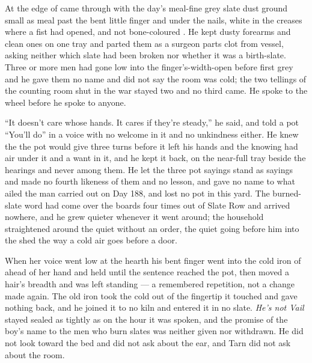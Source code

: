 At the edge of   came through with the day's meal-fine grey slate dust ground small as meal past the bent little finger and under the nails, white in the creases where a fist had opened, and not bone-coloured . He kept dusty forearms and clean ones on one tray and parted them as a surgeon parts clot from vessel, asking neither which slate had been broken nor whether it was a birth-slate. Three or more men had gone low into the finger's-width-open  before first grey and he gave them no name and did not say the room was cold; the two tellings of the counting room shut in the war stayed two and no third came. He spoke to the wheel before he spoke to anyone.

“It doesn't care whose hands. It cares if they're steady,” he said, and told a pot “You'll do” in a voice with no welcome in it and no unkindness either. He knew the  the pot would give three turns before it left his hands and the knowing had air under it and a want in it, and he kept it back, on the near-full tray beside the hearings and never among them. He let the three pot sayings stand as sayings and made no fourth likeness of them and no lesson, and gave no name to what ailed the man carried out on Day 188, and lost no pot in this yard. The burned-slate word had come over the boards four times out of Slate Row and arrived nowhere, and he grew quieter whenever it went around; the household straightened around the quiet without an order, the quiet going before him into the shed the way a cold air goes before a door.

When her voice went low at the hearth his bent finger went into the cold iron of  ahead of her hand and held until the sentence reached the pot, then moved a hair's breadth and was left standing --- a remembered repetition, not a change made again. The old iron took the cold out of the fingertip it touched and gave nothing back, and he joined it to no kiln and entered it in no slate. \emph{He's not Vail} stayed sealed as tightly as on the hour it was spoken, and the promise of the boy's name to the men who burn slates was neither given nor withdrawn. He did not look toward the bed and did not ask about the ear, and Tarn did not ask about the room.

\scenebreak

